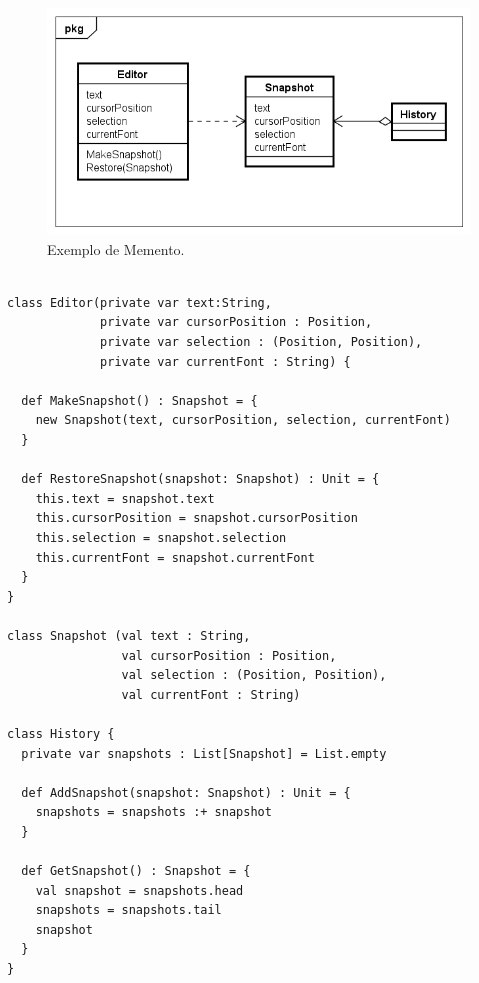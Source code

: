 \begin{figure}[htb]
	\caption{\label{memento_exemplo}Exemplo de Memento.}
	\begin{center}
	    \includegraphics[scale=0.5]{5_padroes-contexto-funcional/5.3_comportamentais/5.3.06_memento/memento_exemplo.png}
	\end{center}
\end{figure}

\begin{lstlisting}[caption={Memento Orientação a Objetos.},label=oomemento]

class Editor(private var text:String,
             private var cursorPosition : Position,
             private var selection : (Position, Position),
             private var currentFont : String) {

  def MakeSnapshot() : Snapshot = {
    new Snapshot(text, cursorPosition, selection, currentFont)
  }

  def RestoreSnapshot(snapshot: Snapshot) : Unit = {
    this.text = snapshot.text
    this.cursorPosition = snapshot.cursorPosition
    this.selection = snapshot.selection
    this.currentFont = snapshot.currentFont
  }
}

class Snapshot (val text : String,
                val cursorPosition : Position,
                val selection : (Position, Position),
                val currentFont : String)
                
class History {
  private var snapshots : List[Snapshot] = List.empty

  def AddSnapshot(snapshot: Snapshot) : Unit = {
    snapshots = snapshots :+ snapshot
  }

  def GetSnapshot() : Snapshot = {
    val snapshot = snapshots.head
    snapshots = snapshots.tail
    snapshot
  }
}

\end{lstlisting}

